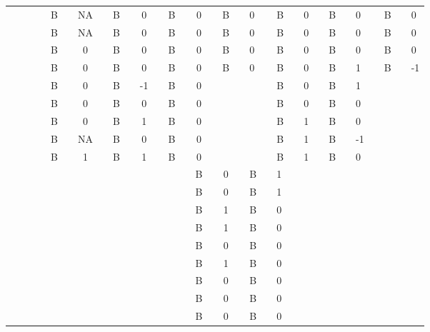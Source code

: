 \documentclass{article}
\begin{document}
\begin{table}
\begin{tabular}{c  c  c  c  c  c  c  c  c  c  c  c  c  c  c  c  c  c}
 &  &  &  & B &   & NA &   & B &   & 0 &   & B &   & 0 &   & B &   & 0 &   & B &   & 0 &   & B &   & 0 &   & B &   & 0 &  \\
 &  &  &  & B &   & NA &   & B &   & 0 &   & B &   & 0 &   & B &   & 0 &   & B &   & 0 &   & B &   & 0 &   & B &   & 0 &  \\
 &  &  &  & B &   & 0 &   & B &   & 0 &   & B &   & 0 &   & B &   & 0 &   & B &   & 0 &   & B &   & 0 &   & B &   & 0 &  \\
 &  &  &  & B &   & 0 &   & B &   & 0 &   & B &   & 0 &   & B &   & 0 &   & B &   & 0 &   & B &   & 1 &   & B &   & -1 &  \\
 &  &  &  & B &   & 0 &   & B &   & -1 &   & B &   & 0 &   &  &  &  &  & B &   & 0 &   & B &   & 1 &  \\
 &  &  &  & B &   & 0 &   & B &   & 0 &   & B &   & 0 &   &  &  &  &  & B &   & 0 &   & B &   & 0 &  \\
 &  &  &  & B &   & 0 &   & B &   & 1 &   & B &   & 0 &   &  &  &  &  & B &   & 1 &   & B &   & 0 &  \\
 &  &  &  & B &   & NA &   & B &   & 0 &   & B &   & 0 &   &  &  &  &  & B &   & 1 &   & B &   & -1 &  \\
 &  &  &  & B &   & 1 &   & B &   & 1 &   & B &   & 0 &   &  &  &  &  & B &   & 1 &   & B &   & 0 &  \\
 &  &  &  &  &  &  &  &  &  &  &  &  &  & B &   & 0 &   & B &   & 1 &  \\
 &  &  &  &  &  &  &  &  &  &  &  &  &  & B &   & 0 &   & B &   & 1 &  \\
 &  &  &  &  &  &  &  &  &  &  &  &  &  & B &   & 1 &   & B &   & 0 &  \\
 &  &  &  &  &  &  &  &  &  &  &  &  &  & B &   & 1 &   & B &   & 0 &  \\
 &  &  &  &  &  &  &  &  &  &  &  &  &  & B &   & 0 &   & B &   & 0 &  \\
 &  &  &  &  &  &  &  &  &  &  &  &  &  & B &   & 1 &   & B &   & 0 &  \\
 &  &  &  &  &  &  &  &  &  &  &  &  &  & B &   & 0 &   & B &   & 0 &  \\
 &  &  &  &  &  &  &  &  &  &  &  &  &  & B &   & 0 &   & B &   & 0 &  \\
 &  &  &  &  &  &  &  &  &  &  &  &  &  & B &   & 0 &   & B &   & 0 &  \\


\end{tabular}
 

\end{table}
\end{document}
